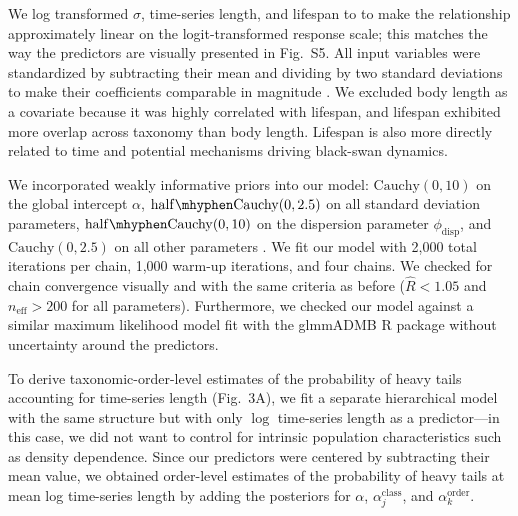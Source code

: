 \documentclass[9pt,twocolumn,twoside]{pnas-new}
\newcommand{\figcorrelates}{{5}}
\begin{document}
{We log transformed \(\sigma\), time-series length, and lifespan to
to make the
relationship approximately linear on the logit-transformed response scale;
this matches the way the predictors are visually presented in
Fig.~S\figcorrelates.
All input variables were standardized by subtracting their mean and dividing by two
standard deviations to make their coefficients comparable in
magnitude \cite{gelman2008c}. We excluded body length as a covariate because it
was highly correlated with lifespan, and lifespan exhibited more overlap across
taxonomy than body length. Lifespan is also more directly related to time and
potential mechanisms driving black-swan dynamics.

We incorporated weakly informative priors into our model: \(\mathrm{Cauchy}(0,
10)\) on the global intercept \(\alpha\), \(\mathrm{half\mhyphen Cauchy}(0,
2.5)\) on all standard deviation parameters, \(\mathrm{half\mhyphen Cauchy}(0,
10)\) on the dispersion parameter \(\phi_\mathrm{disp}\), and
\(\mathrm{Cauchy}(0, 2.5)\) on all other parameters \cite{gelman2006c,
gelman2008d}.
We fit our
model with 2,000 total iterations per chain, 1,000 warm-up iterations,
and four chains. We checked for chain convergence
visually and with the same criteria as before (\(\widehat{R} < 1.05\) and
\(n_\mathrm{eff} >200\) for all parameters). Furthermore, we checked our model
against a similar maximum likelihood model fit with
the glmmADMB \textsf{R} package \cite{glmmadmb}
without uncertainty around the predictors.

To derive taxonomic-order-level estimates of the probability of heavy tails
accounting for time-series length (Fig.~3A), we fit a separate hierarchical
model with the same structure but with only \(\log\) time-series length as a
predictor---in this case, we did not want to control for intrinsic population
characteristics such as density dependence. Since our predictors were centered
by subtracting their mean value, we obtained order-level estimates of the
probability of heavy tails at mean log time-series length by adding the
posteriors for \(\alpha\), \(\alpha^\mathrm{class}_j\), and
\(\alpha^\mathrm{order}_k\).

}
\end{document}
